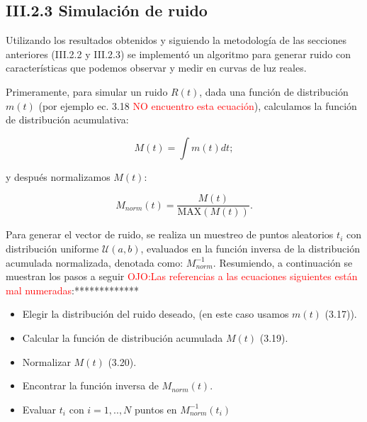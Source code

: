 \subsection*{III.2.3 Simulación de ruido}

Utilizando los resultados obtenidos y siguiendo la metodología de las secciones anteriores (III.2.2 y III.2.3) se implementó un algoritmo para generar ruido con características que podemos observar y medir en curvas de luz reales.

Primeramente, para simular un ruido $R(t)$, dada una función de distribución $m(t)$ (por ejemplo ec. 3.18 \textcolor{red}{NO encuentro esta ecuación}), calculamos la función de distribución acumulativa:

\begin{equation}
  \displaystyle M(t)= \int m(t)dt;
\end{equation}

\noindent y después normalizamos $M(t)$:

\begin{equation}
  \displaystyle M_{norm}(t)= \dfrac{M(t)}{\mbox{MAX}(M(t))}.
\end{equation}

Para generar el vector de ruido, se realiza un muestreo de puntos aleatorios $t_{i}$ con distribución uniforme $\mathcal{U}(a,b)$, evaluados en la función inversa de la distribución acumulada normalizada, denotada como: $M^{-1}_{norm}$. Resumiendo, a continuación se muestran  los pasos a seguir \textcolor{red}{OJO:Las referencias a las ecuaciones siguientes están mal numeradas}:*************

\begin{itemize}
  \item Elegir la distribución del ruido deseado, (en este caso usamos $m(t)$ (3.17)).
  \item Calcular la función de distribución acumulada $M(t)$ (3.19).
  \item Normalizar $M(t)$ (3.20).
  \item Encontrar la función inversa de $M_{norm}(t)$.
  \item Evaluar $t_{i}$ con $i=1,..,N$ puntos en $M^{-1}_{norm}(t_{i})$
\end{itemize}

